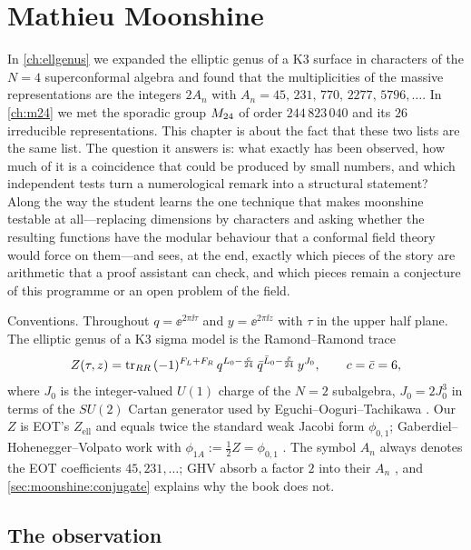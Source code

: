 \chapter{Mathieu Moonshine}\label{ch:moonshine}

In \cref{ch:ellgenus} we expanded the elliptic genus of a K3 surface in characters of the
$N=4$ superconformal algebra and found that the multiplicities of the massive
representations are the integers $2A_n$ with $A_n=45,\,231,\,770,\,2277,\,5796,\dots$.
In \cref{ch:m24} we met the sporadic group $M_{24}$ of order $244\,823\,040$ and its
$26$ irreducible representations. This chapter is about the fact that these two lists are the
same list. The question it answers is: what exactly has been observed, how much of it is a
coincidence that could be produced by small numbers, and which independent tests turn a
numerological remark into a structural statement? Along the way the student learns the one
technique that makes moonshine testable at all---replacing dimensions by characters and
asking whether the resulting functions have the modular behaviour that a conformal field
theory would force on them---and sees, at the end, exactly which pieces of the story are
arithmetic that a proof assistant can check, and which pieces remain a conjecture of this
programme or an open problem of the field.

Conventions. Throughout $q=\ee^{2\pi\ii\tau}$ and $y=\ee^{2\pi\ii z}$ with $\tau$ in the
upper half plane. The elliptic genus of a K3 sigma model is the Ramond--Ramond trace
\begin{equation}\label{eq:moonshine:ellgenus}
  Z(\tau,z)=\operatorname{tr}_{RR}\,(-1)^{F_L+F_R}\,q^{L_0-\frac{c}{24}}\,\bar q^{\bar L_0-\frac{\bar c}{24}}\,
  y^{J_0},\qquad c=\bar c=6,
\end{equation}
where $J_0$ is the integer-valued $U(1)$ charge of the $N=2$ subalgebra, $J_0=2J^3_0$ in
terms of the $SU(2)$ Cartan generator used by Eguchi--Ooguri--Tachikawa
. Our $Z$ is EOT's $Z_{\mathrm{ell}}$ and equals twice the
standard weak Jacobi form $\phi_{0,1}$; Gaberdiel--Hohenegger--Volpato work with
$\phi_{1A}:=\tfrac12 Z=\phi_{0,1}$ . The symbol $A_n$ always
denotes the EOT coefficients $45,231,\dots$; GHV absorb a factor $2$ into their $A_n$
, and \cref{sec:moonshine:conjugate} explains why the book does
not.

\section{The observation}\label{sec:moonshine:observation}

